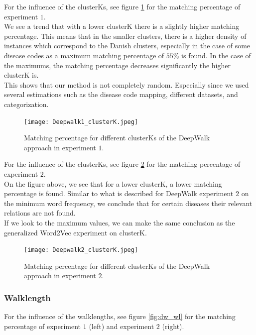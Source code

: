 For the influence of the clusterKs, see figure \ref{fig:dw_clusterK_1} for the matching percentage of experiment $1$. \\
We see a trend that with a lower clusterK there is a slightly higher matching percentage. This means that in the smaller clusters, there is a higher density of instances which correspond to the Danish clusters, especially in the case of some disease codes as a maximum matching percentage of $55$\% is found. In the case of the maximums, the matching percentage decreases significantly the higher clusterK is. \\
This shows that our method is not completely random. Especially since we used several estimations such as the disease code mapping, different datasets, and categorization. \\

\begin{figure}[!htb]
	\centering
	\texttt{[image: Deepwalk1\_clusterK.jpeg]}
	\caption{Matching percentage for different clusterKs of the DeepWalk approach in experiment $1$.}
	\label{fig:dw_clusterK_1}
\end{figure}


\noindent For the influence of the clusterKs, see figure \ref{fig:dw_clusterK_2} for the matching percentage of experiment $2$.\\
On the figure above, we see that for a lower clusterK, a lower matching percentage is found. Similar to what is described for DeepWalk experiment $2$ on the minimum word frequency, we conclude that for certain diseases their relevant relations are not found. \\
If we look to the maximum values, we can make the same conclusion as the generalized Word2Vec experiment on clusterK.

\begin{figure}[!htb]
	\centering
	\texttt{[image: Deepwalk2\_clusterK.jpeg]}
	\caption{Matching percentage for different clusterKs of the DeepWalk approach in experiment $2$.}
	\label{fig:dw_clusterK_2}
\end{figure}


\subsubsection{Walklength}

For the influence of the walklengths, see figure \ref{fig:dw_wl} for the matching percentage of experiment $1$ (left) and experiment $2$ (right). \\

